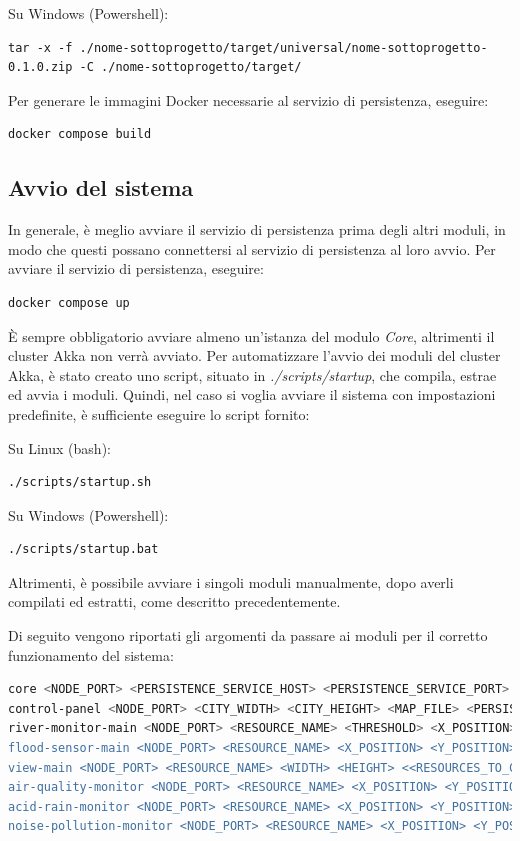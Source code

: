 \documentclass{scrartcl}
\begin{document}
Su Windows (Powershell):
\begin{lstlisting}
tar -x -f ./nome-sottoprogetto/target/universal/nome-sottoprogetto-0.1.0.zip -C ./nome-sottoprogetto/target/
\end{lstlisting}

Per generare le immagini Docker necessarie al servizio di persistenza, eseguire:

\begin{lstlisting}[language=bash]
docker compose build
\end{lstlisting}

\subsection{Avvio del sistema}

In generale, è meglio avviare il servizio di persistenza prima degli altri moduli, in modo che questi possano connettersi al servizio di persistenza al loro avvio. Per avviare il servizio di persistenza, eseguire:

\begin{lstlisting}[language=bash]
docker compose up
\end{lstlisting}

È sempre obbligatorio avviare almeno un'istanza del modulo \textit{Core}, altrimenti il cluster Akka non verrà avviato.
Per automatizzare l'avvio dei moduli del cluster Akka, è stato creato uno script, situato in \textit{./scripts/startup}, che compila, estrae ed avvia i moduli. Quindi, nel caso si voglia avviare il sistema con impostazioni predefinite, è sufficiente eseguire lo script fornito:

Su Linux (bash):

\begin{lstlisting}[language=bash]
./scripts/startup.sh
\end{lstlisting}

Su Windows (Powershell):

\begin{lstlisting}[language=bash]
./scripts/startup.bat
\end{lstlisting}

Altrimenti, è possibile avviare i singoli moduli manualmente, dopo averli compilati ed estratti, come descritto precedentemente.

Di seguito vengono riportati gli argomenti da passare ai moduli per il corretto funzionamento del sistema:
\begin{lstlisting}[language=bash]
core <NODE_PORT> <PERSISTENCE_SERVICE_HOST> <PERSISTENCE_SERVICE_PORT>
control-panel <NODE_PORT> <CITY_WIDTH> <CITY_HEIGHT> <MAP_FILE> <PERSISTENCE_SERVICE_HOST> <PERSISTENCE_SERVICE_PORT>
river-monitor-main <NODE_PORT> <RESOURCE_NAME> <THRESHOLD> <X_POSITION> <Y_POSITION> <<RESOURCES_TO_CHECK>...>
flood-sensor-main <NODE_PORT> <RESOURCE_NAME> <X_POSITION> <Y_POSITION>
view-main <NODE_PORT> <RESOURCE_NAME> <WIDTH> <HEIGHT> <<RESOURCES_TO_CHECK>...>
air-quality-monitor <NODE_PORT> <RESOURCE_NAME> <X_POSITION> <Y_POSITION> <SENSOR_URI>
acid-rain-monitor <NODE_PORT> <RESOURCE_NAME> <X_POSITION> <Y_POSITION>
noise-pollution-monitor <NODE_PORT> <RESOURCE_NAME> <X_POSITION> <Y_POSITION>
\end{lstlisting}
\end{document}
